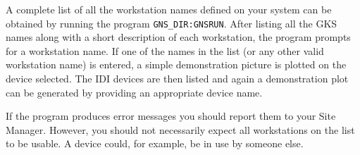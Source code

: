 A complete list of all the workstation names defined on your system can be
obtained by running the program {\tt GNS\_DIR:GNSRUN}.
After listing all the GKS names along with a short description of each
workstation, the program prompts for a workstation name.
If one of the names in the list (or any other valid workstation name) is
entered, a simple demonstration picture is plotted on the device selected.
The IDI devices are then listed and again a demonstration plot can be
generated by providing an appropriate device name.

If the program produces error messages you should report them to your Site
Manager.
However, you should not necessarily expect all workstations on the list to be
usable.
A device could, for example, be in use by someone else.
